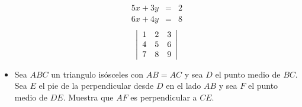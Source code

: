 \documentclass [12pt]{article}
\begin{document}
\begin{itemize}
\begin{eqnarray*}
	5x + 3y &=& 2 \\
	6x + 4y &=& 8 
\end{eqnarray*}
$$
\left|
\begin{array}{ c c c}
	1 & 2 & 3 \\
	4 & 5 & 6 \\
	7 & 8 & 9 \\
\end{array}
\right|
$$
\vspace{.6in}

\item  Sea $ABC$ un triangulo is\'osceles con $AB=AC$  y sea $D$ el punto  medio
de $BC$. Sea $E$ el pie de la perpendicular desde $D$ en el lado $AB$ y sea $F$ el punto medio de $DE$.
Muestra que $AF$ es perpendicular a $CE$.

\end{itemize}
\end{document}
